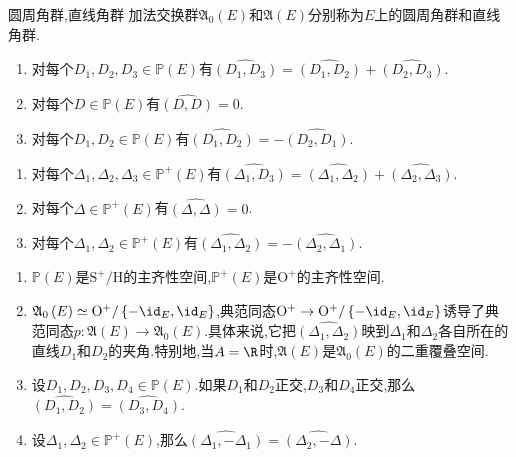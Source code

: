 \begin{definition}{圆周角群,直线角群}{}
	加法交换群$\mathfrak{A}_{0}\left(E\right)$和$\mathfrak{A}\left(E\right)$分别称为$E$上的圆周角群和直线角群.
\end{definition}

\begin{proposition}{}{}
	\begin{enumerate}
		\item 对每个$D_{1},D_{2},D_{3}\in\mathbb{P}\left(E\right)$有$\widehat{\left(D_{1},D_{3}\right)}=\widehat{\left(D_{1},D_{2}\right)}+\widehat{\left(D_{2},D_{3}\right)}$.
		\item 对每个$D\in\mathbb{P}\left(E\right)$有$\widehat{\left(D,D\right)}=0$.
		\item 对每个$D_{1},D_{2}\in\mathbb{P}\left(E\right)$有$\widehat{\left(D_{1},D_{2}\right)}=-\widehat{\left(D_{2},D_{1}\right)}$.
	\end{enumerate}
\end{proposition}

\begin{proposition}{}{}
	\begin{enumerate}
		\item 对每个$\Delta_{1},\Delta_{2},\Delta_{3}\in\mathbb{P}^{+}\left(E\right)$有$\widehat{\left(\Delta_{1},D_{3}\right)}=\widehat{\left(\Delta_{1},\Delta_{2}\right)}+\widehat{\left(\Delta_{2},\Delta_{3}\right)}$.
		\item 对每个$\Delta\in\mathbb{P}^{+}\left(E\right)$有$\widehat{\left(\Delta,\Delta\right)}=0$.
		\item 对每个$\Delta_{1},\Delta_{2}\in\mathbb{P}^{+}\left(E\right)$有$\widehat{\left(\Delta_{1},\Delta_{2}\right)}=-\widehat{\left(\Delta_{2},\Delta_{1}\right)}$.
	\end{enumerate}
\end{proposition}

\begin{remark}{}{}
	\begin{enumerate}
		\item $\mathbb{P}\left(E\right)$是$\mathrm{S}^{+}/\mathrm{H}$的主齐性空间,$\mathbb{P}^{+}\left(E\right)$是$\mathrm{O}^{+}$的主齐性空间.
		\item$\mathfrak{A}_{0}\left(E\right)\simeq\mathrm{O}^{+}/\left\{-\id_{E},\id_{E}\right\}$,典范同态$\mathrm{O}^{+}\to\mathrm{O}^{+}/\left\{-\id_{E},\id_{E}\right\}$诱导了典范同态$p:\mathfrak{A}\left(E\right)\to\mathfrak{A}_{0}\left(E\right)$.具体来说,它把$\widehat{\left(\Delta_{1},\Delta_{2}\right)}$映到$\Delta_{1}$和$\Delta_{2}$各自所在的直线$D_{1}$和$D_{2}$的夹角.特别地,当$A=\R$时,$\mathfrak{A}\left(E\right)$是$\mathfrak{A}_{0}\left(E\right)$的二重覆叠空间.
		\item 设$D_{1},D_{2},D_{3},D_{4}\in\mathbb{P}\left(E\right)$.如果$D_{1}$和$D_{2}$正交,$D_{3}$和$D_{4}$正交,那么$\widehat{\left(D_{1},D_{2}\right)}=\widehat{\left(D_{3},D_{4}\right)}$.
		\item 设$\Delta_{1},\Delta_{2}\in\mathbb{P}^{+}\left(E\right)$,那么$\widehat{\left(\Delta_{1},-\Delta_{1}\right)}=\widehat{\left(\Delta_{2},-\Delta\right)}$.
	\end{enumerate}
\end{remark}

